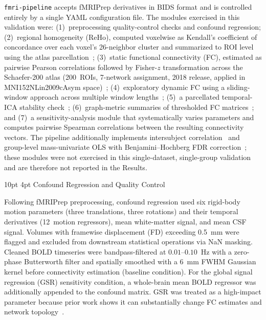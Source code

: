 \documentclass[12pt]{article}
\makeatletter
\renewcommand\subsection{%
  \@startsection{subsection}{2}{\z@}%
    {10pt \@plus 2pt \@minus 1pt}%
    {4pt}%
    {\normalfont\normalsize\bfseries}}
\makeatother
\begin{document}
\texttt{fmri-pipeline} accepts fMRIPrep derivatives in BIDS format and
is controlled entirely by a single YAML configuration file. The modules
exercised in this validation were: (1)~preprocessing quality-control
checks and confound regression; (2)~regional homogeneity (ReHo),
computed voxelwise as Kendall's coefficient of concordance over each
voxel's 26-neighbor cluster and summarized to ROI level using the atlas
parcellation~\citep{zang2004regional}; (3)~static functional
connectivity (FC), estimated as pairwise Pearson correlations followed
by Fisher-$z$ transformation across the Schaefer-200 atlas (200~ROIs,
7-network assignment, 2018 release, applied in MNI152NLin2009cAsym
space)~\citep{schaefer2018local, yeo2011organization}; (4)~exploratory
dynamic FC using a sliding-window approach across multiple window
lengths~\citep{damaraju2014dynamic}; (5)~a parcellated temporal-ICA
stability check~\citep{hyvarinen1999fast, kuhn1955hungarian};
(6)~graph-metric summaries of thresholded FC
matrices~\citep{bullmore2009complex}; and (7)~a sensitivity-analysis
module that systematically varies parameters and computes pairwise
Spearman correlations between the resulting connectivity vectors. The
pipeline additionally implements intersubject
correlation~\citep{kumar2021brainiak} and group-level mass-univariate
OLS with Benjamini--Hochberg FDR correction~\citep{benjamini1995controlling};
these modules were not exercised in this single-dataset, single-group
validation and are therefore not reported in the Results.

\subsection{Confound Regression and Quality Control}

Following fMRIPrep preprocessing, confound regression used six
rigid-body motion parameters (three translations, three rotations) and
their temporal derivatives (12~motion regressors), mean white-matter
signal, and mean CSF signal. Volumes with framewise displacement (FD)
exceeding 0.5~mm were flagged and excluded from downstream statistical
operations via NaN masking. Cleaned BOLD timeseries were
bandpass-filtered at $0.01$--$0.10$~Hz with a zero-phase Butterworth
filter and spatially smoothed with a 6~mm FWHM Gaussian kernel before
connectivity estimation (baseline condition). For the global signal
regression (GSR) sensitivity condition, a whole-brain mean BOLD
regressor was additionally appended to the confound matrix. GSR was
treated as a high-impact parameter because prior work shows it can
substantially change FC estimates and network
topology~\citep{power2012spurious, murphy2017towards}.
\end{document}

